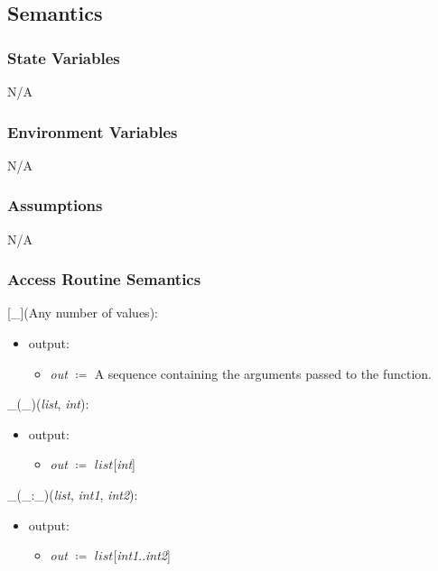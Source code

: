 \documentclass[12pt, titlepage]{article}
\begin{document}
\subsection{Semantics}

\subsubsection{State Variables}
N/A

\subsubsection{Environment Variables}

N/A

\subsubsection{Assumptions}

N/A

\subsubsection{Access Routine Semantics}

[\_](Any number of values):
\begin{itemize}
	\item output: 
	\begin{itemize}
		\item[] \textit{out} $\coloneqq$ A sequence containing the arguments 
		passed to the function.
	\end{itemize}
\end{itemize}

\noindent \_(\_)(\textit{list}, \textit{int}):
\begin{itemize}
	\item output: 
	\begin{itemize}
		\item[] \textit{out} $\coloneqq$ $list$[\textit{int}]	
	\end{itemize}
\end{itemize}

\noindent \_(\_:\_)(\textit{list}, \textit{int1}, \textit{int2}):
\begin{itemize}
	\item output: 
	\begin{itemize}
		\item[] \textit{out} $\coloneqq$ $list$[\textit{int1}..\textit{int2}]
	\end{itemize}
\end{itemize}
\end{document}
